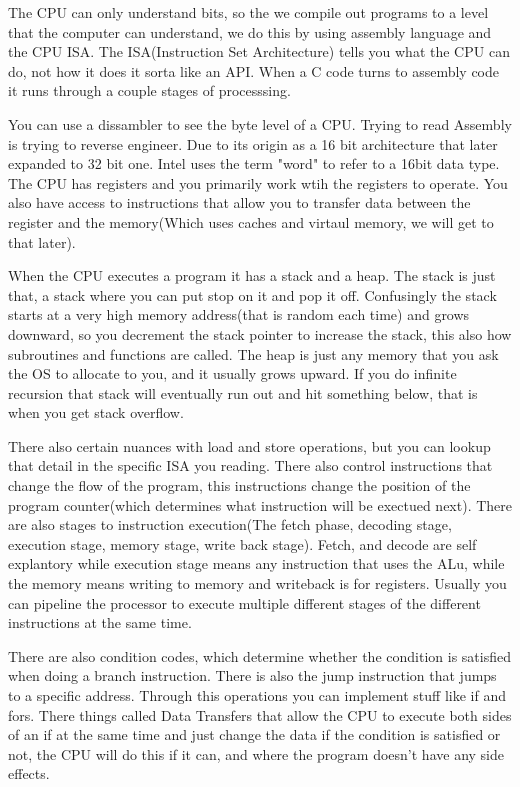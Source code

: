 \documentclass{article}
\begin{document}
The CPU can only understand bits, so the we compile out programs to a level that the computer can understand, we do this by using assembly language and the CPU ISA.
The ISA(Instruction Set Architecture) tells you what the CPU can do, not how it does it sorta like an API. When a C code turns to assembly code it runs through a couple stages of processsing.

You can use a dissambler to see the byte level of a CPU. Trying to read Assembly is trying to reverse engineer. Due to its origin as a 16 bit architecture that later expanded to 32 bit  one. Intel uses the term "word" to refer to a 16bit data type. The CPU has registers and you primarily work wtih the registers to operate. You also have 
access to instructions that allow you to transfer data between the register and the memory(Which uses caches and virtaul memory, we will get to that later).

When the CPU executes a program it has a stack and a heap. The stack is just that, a stack where  you can put stop on it and pop it off. Confusingly the stack starts at a very high memory address(that is random each time) and grows downward, so you decrement the stack pointer to increase the stack, this also how subroutines and functions are called. The heap is just any memory that you ask the OS to allocate to you, and it usually grows upward. If you do infinite recursion that stack will eventually run out and hit something below, that is when you get 
stack overflow.

There also certain nuances with load and store operations, but you can lookup that detail in the specific ISA you reading. There also control instructions that change the flow of 
the program, this instructions change the position of the program counter(which determines what instruction will be exectued next). There are also stages to instruction execution(The fetch phase, decoding stage, execution stage, memory stage, write back stage). Fetch, and decode are self explantory while execution stage means any instruction that uses the ALu, while the memory means writing to memory and writeback is for registers. Usually you can pipeline the processor to execute multiple different stages of the different instructions at the same time.


There are also condition codes, which determine whether the condition is satisfied when doing a branch instruction. There is also the jump instruction that jumps to a specific address. Through this operations you can implement stuff like if and fors. There things called Data Transfers that allow the CPU to execute both sides of an if at the same time and just change the data if the condition is satisfied or not, the CPU will do this if it can, and where the program doesn't have any side effects.
\end{document}
